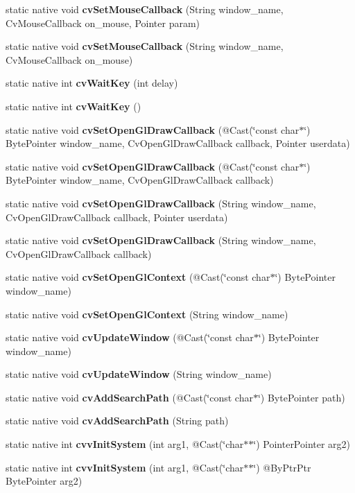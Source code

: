 \begin{DoxyCompactItemize}
static native void {\bfseries cv\+Set\+Mouse\+Callback} (String window\+\_\+name, Cv\+Mouse\+Callback on\+\_\+mouse, Pointer param)
\item 
static native void {\bfseries cv\+Set\+Mouse\+Callback} (String window\+\_\+name, Cv\+Mouse\+Callback on\+\_\+mouse)
\item 
static native int {\bfseries cv\+Wait\+Key} (int delay)
\item 
static native int {\bfseries cv\+Wait\+Key} ()
\item 
static native void {\bfseries cv\+Set\+Open\+Gl\+Draw\+Callback} (@Cast(\char`\"{}const char$\ast$\char`\"{}) Byte\+Pointer window\+\_\+name, Cv\+Open\+Gl\+Draw\+Callback callback, Pointer userdata)
\item 
static native void {\bfseries cv\+Set\+Open\+Gl\+Draw\+Callback} (@Cast(\char`\"{}const char$\ast$\char`\"{}) Byte\+Pointer window\+\_\+name, Cv\+Open\+Gl\+Draw\+Callback callback)
\item 
static native void {\bfseries cv\+Set\+Open\+Gl\+Draw\+Callback} (String window\+\_\+name, Cv\+Open\+Gl\+Draw\+Callback callback, Pointer userdata)
\item 
static native void {\bfseries cv\+Set\+Open\+Gl\+Draw\+Callback} (String window\+\_\+name, Cv\+Open\+Gl\+Draw\+Callback callback)
\item 
static native void {\bfseries cv\+Set\+Open\+Gl\+Context} (@Cast(\char`\"{}const char$\ast$\char`\"{}) Byte\+Pointer window\+\_\+name)
\item 
static native void {\bfseries cv\+Set\+Open\+Gl\+Context} (String window\+\_\+name)
\item 
static native void {\bfseries cv\+Update\+Window} (@Cast(\char`\"{}const char$\ast$\char`\"{}) Byte\+Pointer window\+\_\+name)
\item 
static native void {\bfseries cv\+Update\+Window} (String window\+\_\+name)
\item 
static native void {\bfseries cv\+Add\+Search\+Path} (@Cast(\char`\"{}const char$\ast$\char`\"{}) Byte\+Pointer path)
\item 
static native void {\bfseries cv\+Add\+Search\+Path} (String path)
\item 
static native int {\bfseries cvv\+Init\+System} (int arg1, @Cast(\char`\"{}char$\ast$$\ast$\char`\"{}) Pointer\+Pointer arg2)
\item 
static native int {\bfseries cvv\+Init\+System} (int arg1, @Cast(\char`\"{}char$\ast$$\ast$\char`\"{}) @By\+Ptr\+Ptr Byte\+Pointer arg2)
\item 

\end{DoxyCompactItemize}
